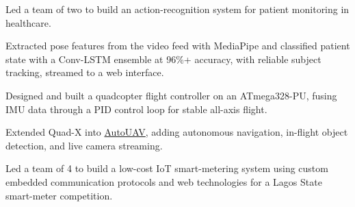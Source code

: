 
\begin{details}
    \item Led a team of two to build an action-recognition system for patient monitoring in healthcare.
    \item Extracted pose features from the video feed with MediaPipe and classified patient state with a Conv-LSTM ensemble at 96\%+ accuracy, with reliable subject tracking, streamed to a web interface.
\end{details}

\begin{details}
    \item Designed and built a quadcopter flight controller on an ATmega328-PU, fusing IMU data through a PID control loop for stable all-axis flight.
    \item Extended Quad-X into \href{https://www.nelsonelijah.com/projects/autouav}{AutoUAV}, adding autonomous navigation, in-flight object detection, and live camera streaming.
\end{details}

\begin{details}
    \item Led a team of 4 to build a low-cost IoT smart-metering system using custom embedded communication protocols and web technologies for a Lagos State smart-meter competition.
\end{details}
